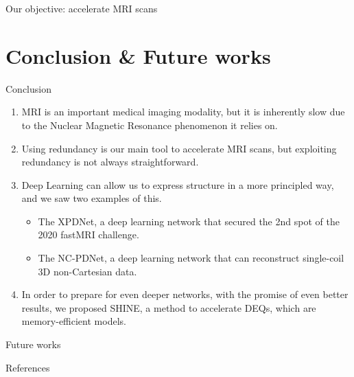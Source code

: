 \documentclass[aspectratio=169,xcolor=dvipsnames]{beamer}
\begin{document}
\begin{frame}{Our objective: accelerate MRI scans}
    \begin{multicols}{2}
    \tableofcontents
    \end{multicols}
\end{frame}







% 


\section{Conclusion \& Future works}

\begin{frame}{Conclusion}
    \begin{enumerate}[<+->]
        \item MRI is an important medical imaging modality, but it is inherently slow due to the Nuclear Magnetic Resonance phenomenon it relies on.
        \item Using redundancy is our main tool to accelerate MRI scans, but exploiting redundancy is not always straightforward.
        \item Deep Learning can allow us to express structure in a more principled way, and we saw two examples of this.
        \begin{itemize}[<+->]
            \item The XPDNet, a deep learning network that secured the 2nd spot of the 2020 fastMRI challenge.
            \item The NC-PDNet, a deep learning network that can reconstruct single-coil 3D non-Cartesian data.
        \end{itemize}
        \item In order to prepare for even deeper networks, with the promise of even better results, we proposed SHINE, a method to accelerate DEQs, which are memory-efficient models.
    \end{enumerate}
\end{frame}

\begin{frame}{Future works}
\end{frame}

\begin{frame}[allowframebreaks]{References}
    \printbibliography
\end{frame}
\end{document}
